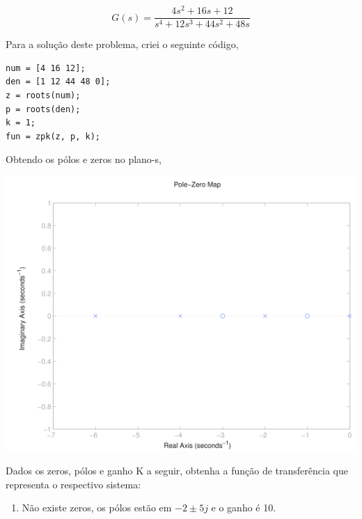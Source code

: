 \documentclass[a4paper, 10pt]{article}
\begin{document}
\begin{list}{\textbf{Questão .}}{
\setlength{\labelwidth}{-2mm} \setlength{\parsep}{0mm}
\setlength{\topsep}{0mm} \setlength{\leftmargin}{0mm}}
    $$
    G(s) = \frac{4 s^2 + 16 s + 12}{s^4 + 12 s^3 +  44 s^2 + 48 s}
    $$


    Para a solução deste problema, criei o seguinte código,

 
     \begin{lstlisting}
num = [4 16 12];
den = [1 12 44 48 0];
z = roots(num);
p = roots(den);
k = 1;
fun = zpk(z, p, k);
     \end{lstlisting}

     Obtendo os pólos e zeros no plano-s,
        \begin{center}
                \includegraphics[scale=0.15]{fig3q.png}
             \end{center}
    



\newpage

         \item
             Dados os zeros, pólos e ganho K a seguir, obtenha 
             a função de transferência que representa o respectivo sistema:
        \begin{enumerate}
            \item

                Não existe zeros, os pólos estão em $-2\pm5j$ e o ganho é 10.\\
                

\end{enumerate}
\end{list}
\end{document}
